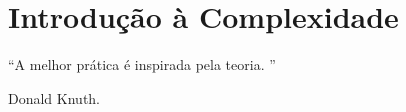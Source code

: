 \chapter{Introdução à Complexidade}\label{cap:IntroducaoComplexidade}


\epigraph{``A melhor prática é inspirada pela teoria. ''}{Donald Knuth.}


